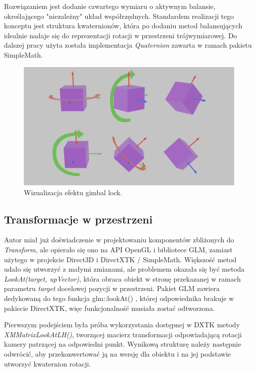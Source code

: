 Rozwiązaniem jest dodanie czwartego wymiaru o aktywnym balansie, określającego "niezależny" układ współrzędnych. Standardem realizacji tego konceptu jest struktura kwaternionów, która po dodaniu metod balansujących idealnie nadaje się do reprezentacji rotacji w przestrzeni trójwymiarowej. Do dalszej pracy użyta została implementacja \textit{Quaternion} zawarta w ramach pakietu SimpleMath.

\vfill

\begin{figure}[h!]
	\centering
	\includegraphics[width=\textwidth]{images/gimbal_lock.png}
	\caption{Wizualizacja efektu gimbal lock.}
	\label{GimbalLock}
\end{figure}

\subsection{Transformacje w przestrzeni}
Autor miał już doświadczenie w projektowaniu komponentów zbliżonych do \textit{Transform}, ale opierało się ono na API OpenGL i bibliotece GLM, zamiast użytego w projekcie Direct3D i DirectXTK / SimpleMath. Większość metod udało się utworzyć z małymi zmianami, ale problemem okazała się być metoda \textit{LookAt(target, upVector)}, która obraca obiekt w stronę przekazanej w ramach parametru \textit{target} docelowej pozycji w przestrzeni. Pakiet GLM zawiera dedykowaną do tego funkcja glm::lookAt() \cite{glm:docs:look_at}, której odpowiednika brakuje w pakiecie DirectXTK, więc funkcjonalność musiała zostać odtworzona. 

Pierwszym podejściem była próba wykorzystania dostępnej w DXTK metody \textit{XMMatrixLookAtLH()}, tworzącej macierz transformacji odpowiadającą rotacji kamery patrzącej na odpowiedni punkt. Wynikową strukturę należy następnie odwrócić, aby przekonwertować ją na wersję dla obiektu i na jej podstawie utworzyć kwaternion rotacji. 

